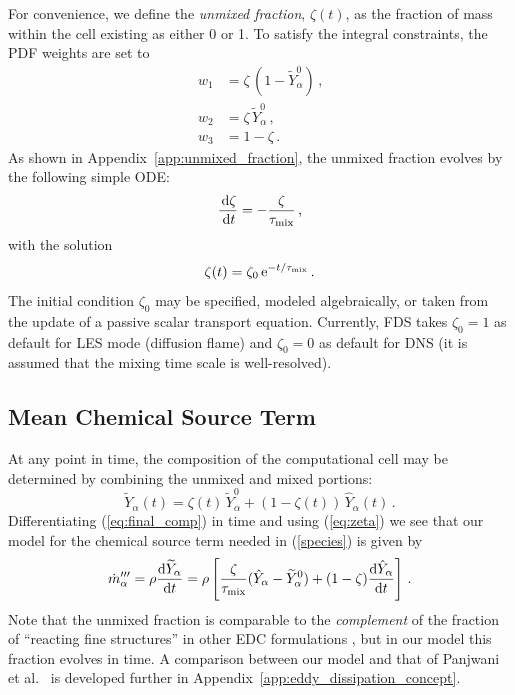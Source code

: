 For convenience, we define the \emph{unmixed fraction}, $\zeta(t)$, as the fraction of mass within the cell existing as either 0 or 1.  To satisfy the integral constraints, the PDF weights are set to
\begin{align}
w_1 &= \zeta \, (1 - \widetilde{Y}_\alpha^0) \,\mbox{,} \\
w_2 &= \zeta \, \widetilde{Y}_\alpha^0 \,\mbox{,} \\
w_3 &= 1-\zeta \,\mbox{.}
\end{align}
As shown in Appendix~\ref{app:unmixed_fraction}, the unmixed fraction evolves by the following simple ODE:
\begin{equation}
\label{eq:zeta}
\frac{\,\mathrm{d} \zeta}{\,\mathrm{d} t}=-\frac{\zeta}{\tau_{\rm mix}} \,\mbox{,}
\end{equation}
with the solution
\begin{equation}
\label{eq:zeta_soln}
\zeta(t) = \zeta_0 \,{\rm e}^{-t/\tau_{\rm mix}} \,\mbox{.}
\end{equation}
The initial condition $\zeta_0$ may be specified, modeled algebraically, or taken from the update of a passive scalar transport equation.  Currently, FDS takes $\zeta_0=1$ as default for LES mode (diffusion flame) and $\zeta_0=0$ as default for DNS (it is assumed that the mixing time scale is well-resolved).


\subsection{Mean Chemical Source Term}
\label{source_term}

At any point in time, the composition of the computational cell may be determined by combining the unmixed and mixed portions:
\begin{equation}
\label{eq:final_comp}
\widetilde{Y}_{\alpha}(t)= \zeta(t) \, \widetilde{Y}_{\alpha}^0 + (1-\zeta(t)) \, \hat{Y}_{\alpha}(t) \,\mbox{.}
\end{equation}
Differentiating (\ref{eq:final_comp}) in time and using (\ref{eq:zeta}) we see that our model for the chemical source term needed in (\ref{species}) is given by
\begin{equation}
\label{mass_prod_rate} 
\dot{m}^{\prime\prime\prime}_{\alpha} = \rho \frac{\mbox{d}\widetilde{Y}_{\alpha}}{\mbox{d}t} 
= \rho \left[ \frac{\zeta}{\tau_{\rm{mix}}} (\hat{Y}_\alpha - \widetilde{Y}_{\alpha}^0)  + (1-\zeta) \frac{\mbox{d}\hat{Y}_\alpha}{\mbox{d}t} \right] \,\mbox{.}
\end{equation}
Note that the unmixed fraction is comparable to the \emph{complement} of the fraction of ``reacting fine structures'' in other EDC formulations \cite{Chen:1,Panjwani:2010}, but in our model this fraction evolves in time.  A comparison between our model and that of Panjwani et al.~\cite{Panjwani:2010} is developed further in Appendix~\ref{app:eddy_dissipation_concept}.

